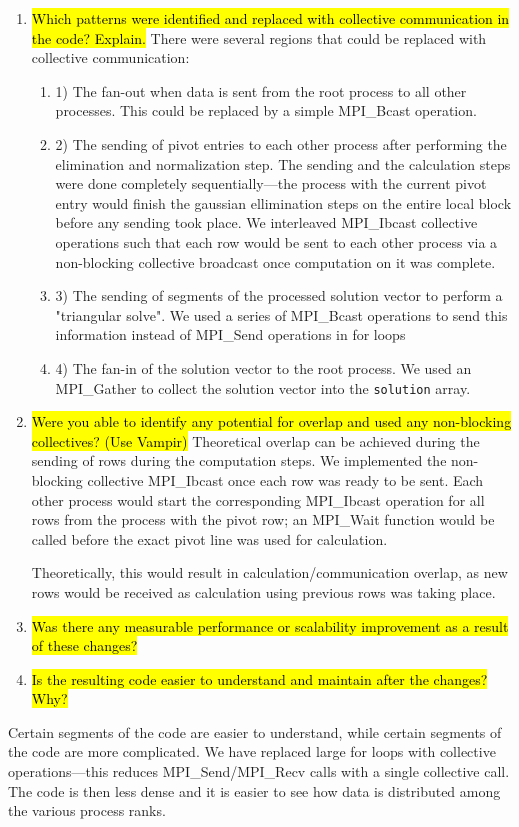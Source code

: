 \begin{enumerate}
	\item \hl{Which patterns were identified and replaced with collective communication in the code? Explain.}
	There were several regions that could be replaced with collective communication:
	\begin{enumerate}
	\item 1) The fan-out when data is sent from the root process to all other processes. This could be replaced by a simple MPI_Bcast operation. 
	
	\item 2) The sending of pivot entries to each other process after performing the elimination and normalization step. The sending and the calculation steps were done completely sequentially---the process with the current pivot entry would finish the gaussian ellimination steps on the entire local block before any sending took place. We interleaved MPI_Ibcast collective operations such that each row would be sent to each other process via a non-blocking collective broadcast once computation on it was complete.
	
	\item 3) The sending of segments of the processed solution vector to perform a "triangular solve". We used a series of MPI_Bcast operations to send this information instead of MPI_Send operations in for loops
	
	\item 4) The fan-in of the solution vector to the root process. We used an MPI_Gather to collect the solution vector into the \verb!solution! array.
	
	\end{enumerate}
	\item \hl{Were you able to identify any potential for overlap and used any non-blocking collectives? (Use Vampir)}	
	Theoretical overlap can be achieved during the sending of rows during the computation steps. We implemented the non-blocking collective MPI_Ibcast once each row was ready to be sent. Each other process would start the corresponding MPI_Ibcast operation for all rows from the process with the pivot row; an MPI_Wait function would be called before the exact pivot line was used for calculation.
	
	Theoretically, this would result in calculation/communication overlap, as new rows would be received as calculation using previous rows was taking place.
	
	
	\item \hl{Was there any measurable performance or scalability improvement as a result of these changes?}		
	
	\item \hl{Is the resulting code easier to understand and maintain after the changes? Why?}	
\end{enumerate}
	Certain segments of the code are easier to understand, while certain segments of the code are more complicated. We have replaced large for loops with collective operations---this reduces MPI_Send/MPI_Recv calls with a single collective call. The code is then less dense and it is easier to see how data is distributed among the various process ranks.
	
